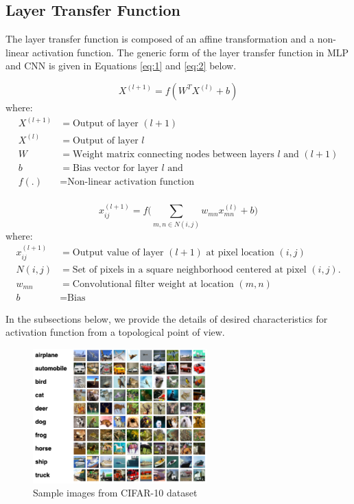 \documentclass[wcp]{jmlr}
\begin{document}
\subsection{Layer Transfer Function}
The layer transfer function is composed of an affine transformation and a non-linear activation function. The generic form of the layer transfer function in MLP and CNN is given in Equations \ref{eq:1} and \ref{eq:2} below.

\begin{equation} \label{eq:1}
X^{(l + 1)} = f(W^TX^{(l)} + b)
\end{equation}
where:
\begin{align*}
X^{(l + 1)} &= \text{Output of layer $(l + 1)$ }\\
X^{(l)} &= \text{Output of layer $l$} \\
W &= \text{Weight matrix connecting nodes between layers $l$ and $(l + 1)$} \\
b &= \text{Bias vector for layer $l$ and} \\
f(.) &= \text{Non-linear activation function}\\
\end{align*}

\begin{equation} \label{eq:2}
x_{ij}^{(l + 1)} = f(\sum_{m,n \in N(i,j)}{w_{mn}x_{mn}^{(l)} + b)}
\end{equation}
where:
\begin{align*}
x_{ij}^{(l + 1)} &= \text{Output value of layer $(l + 1)$ at pixel location $(i,j)$ }\\
N(i,j) &= \text{Set of pixels in a square neighborhood centered at pixel $(i,j)$.} \\
w_{mn} &= \text{Convolutional filter weight at location $(m,n)$ } \\
b &= \text{Bias }
\end{align*}

In the subsections below, we provide the details of desired characteristics for activation function from a topological point of view.

\begin{figure}[htp]
\begin{center}
\includegraphics[width=0.6\textwidth]{images/Cifar10.png}
\caption{Sample images from CIFAR-10 dataset}\label{fig:cifar10}
\end{center}
\end{figure}
\end{document}
